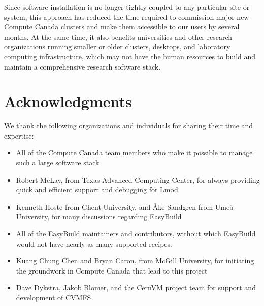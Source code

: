 \documentclass[sigconf]{acmart}
\begin{document}
Since software installation is no longer tightly coupled to any particular site or system, this approach has reduced the time required to commission major new Compute Canada clusters and make them accessible to our users by several months. At the same time, it also benefits universities and other research organizations running smaller or older clusters, desktops, and laboratory computing infrastructure, which may not have the human resources to build and maintain a comprehensive research software stack.


\section{Acknowledgments}
\label{sec:Acknowledgments}
We thank the following organizations and individuals for sharing their time and expertise:
\begin{itemize}
	\item All of the Compute Canada team members who make it possible to manage such a large software stack
	\item Robert McLay, from Texas Advanced Computing Center, for always providing quick and efficient support and
debugging for Lmod
	\item Kenneth Hoste from Ghent University, and Åke Sandgren from Umeå University, for many discussions
regarding EasyBuild
    \item All of the EasyBuild maintainers and contributors, without which EasyBuild would not have nearly as many supported recipes.
	\item Kuang Chung Chen and Bryan Caron, from McGill University, for initiating the groundwork in Compute Canada that lead to this project
	\item Dave Dykstra, Jakob Blomer, and the CernVM project team for support and development of CVMFS
\end{itemize}



\end{document}
